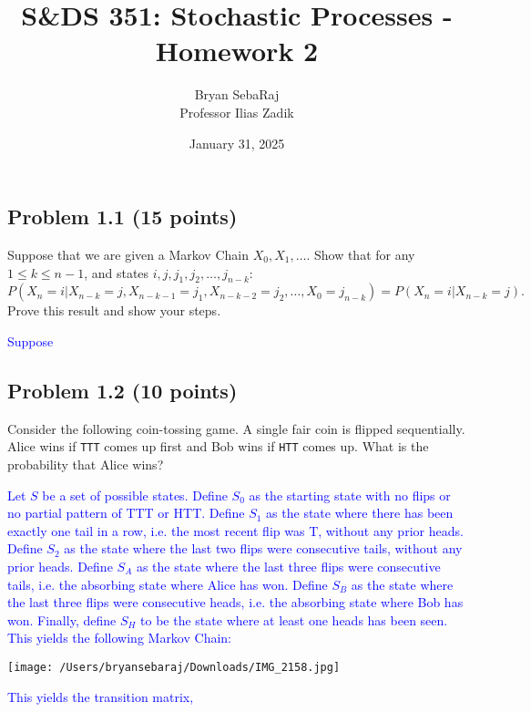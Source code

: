 \documentclass{article}
\title{S\&DS 351: Stochastic Processes - Homework 2}
\author{Bryan SebaRaj \\[0.8em] Professor Ilias Zadik}
\date{January 31, 2025}
\begin{document}
\maketitle

\subsection*{Problem 1.1 (15 points)}
Suppose that we are given a Markov Chain $X_0, X_1, \ldots$. Show that for any $1 \leq k \leq n-1$, and states $i, j, j_1, j_2, \ldots, j_{n-k}$:
\[
P(X_n = i | X_{n-k} = j, X_{n-k-1} = j_1, X_{n-k-2} = j_2, \ldots, X_0 = j_{n-k}) = P(X_n = i | X_{n-k} = j).
\]
Prove this result and show your steps.

\textcolor{blue}{Suppose }

\subsection*{Problem 1.2 (10 points)} 
Consider the following
coin-tossing game. A single fair coin is flipped sequentially. Alice
wins if \texttt{TTT} comes up first and Bob wins if \texttt{HTT}
comes up. What is the probability that Alice wins?


\textcolor{blue}{Let $S$ be a set of possible states. Define $S_0$ as the starting state with no flips or no partial pattern of TTT or HTT. Define $S_1$ as the state where there has been exactly one tail in a row, i.e. the most recent flip was T, without any prior heads. Define $S_2$ as the state where the last two flips were consecutive tails, without any prior heads. Define $S_A$ as the state where the last three flips were consecutive tails, i.e. the absorbing state where Alice has won. Define $S_B$ as the state where the last three flips were consecutive heads, i.e. the absorbing state where Bob has won. Finally, define $S_H$ to be the state where at least one heads has been seen. \\ This yields the following Markov Chain:}

\begin{center}
\texttt{[image: /Users/bryansebaraj/Downloads/IMG\_2158.jpg]}
\end{center}

\textcolor{blue}{This yields the transition matrix,}
\end{document}
